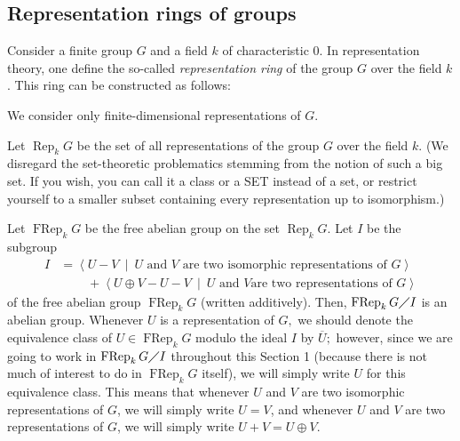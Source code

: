 \documentclass[numbers=enddot,12pt,final,onecolumn,notitlepage]{scrartcl}%
\begin{document}
\subsection{Representation rings of groups}

Consider a finite group $G$ and a field $k$ of characteristic $0$. In
representation theory, one define the so-called \textit{representation ring}
of the group $G$ over the field $k$. This ring can be constructed as follows:

We consider only finite-dimensional representations of $G$.

Let $\operatorname*{Rep}_{k}G$ be the set of all representations of the group
$G$ over the field $k$. (We disregard the set-theoretic problematics stemming
from the notion of such a big set. If you wish, you can call it a class or a
SET instead of a set, or restrict yourself to a smaller subset containing
every representation up to isomorphism.)

Let $\operatorname*{FRep}_{k}G$ be the free abelian group on the set
$\operatorname*{Rep}_{k}G$. Let $I$ be the subgroup%
\begin{align*}
I  &  =\left\langle U-V\ \mid\ U\text{ and }V\text{ are two isomorphic
representations of }G\right\rangle \\
&  \ \ \ \ \ \ \ \ \ \ +\left\langle U\oplus V-U-V\ \mid\ U\text{ and }V\text{
are two representations of }G\right\rangle
\end{align*}
of the free abelian group $\operatorname*{FRep}_{k}G$ (written additively).
Then, $\operatorname*{FRep}_{k}G\diagup I$ is an abelian group. Whenever $U$
is a representation of $G,$ we should denote the equivalence class of
$U\in\operatorname*{FRep}_{k}G$ modulo the ideal $I$ by $\overline{U};$
however, since we are going to work in $\operatorname*{FRep}_{k}G\diagup I$
throughout this Section 1 (because there is not much of interest to do in
$\operatorname*{FRep}_{k}G$ itself), we will simply write $U$ for this
equivalence class. This means that whenever $U$ and $V$ are two isomorphic
representations of $G$, we will simply write $U=V$, and whenever $U$ and $V$
are two representations of $G$, we will simply write $U+V=U\oplus V$.
\end{document}
